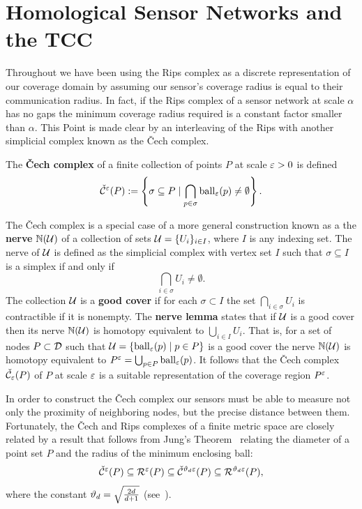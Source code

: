 \section{Homological Sensor Networks and the TCC} %
\label{sec:tcc}

Throughout we have been using the Rips complex as a discrete representation of our coverage domain by assuming our sensor's coverage radius is equal to their communication radius.
In fact, if the Rips complex of a sensor network at scale $\alpha$ has no gaps the minimum coverage radius required is a constant factor smaller than $\alpha$.
This Point is made clear by an interleaving of the Rips with another simplicial complex known as the \v Cech complex.

\begin{definition}
    The \textbf{\v Cech complex} of a finite collection of points $P$ at scale $\varepsilon > 0$ is defined
    \[ \check{\mathcal{C}}^\varepsilon(P) := \left\{\sigma \subseteq P\mid \bigcap_{p\in \sigma}\mathrm{ball}_\varepsilon(p)\neq \emptyset \right\}. \]
\end{definition}
The \v Cech complex is a special case of a more general construction known as a the \textbf{nerve} $\mathbb{N}({\mathcal{U}})$ of a collection of sets ${\mathcal{U}} = \{U_i\}_{i\in I}$, where $I$ is any indexing set.
The nerve of ${\mathcal{U}}$ is defined as the simplicial complex with vertex set $I$ such that $\sigma\subseteq I$ is a simplex if and only if \[\bigcap_{i\in \sigma} U_i\neq \emptyset.\]
The collection ${\mathcal{U}}$ is a \textbf{good cover} if for each $\sigma\subset I$ the set $\bigcap_{i\in\sigma} U_i$ is contractible if it is nonempty.
The \textbf{nerve lemma} states that if ${\mathcal{U}}$ is a good cover then its nerve $\mathbb{N}({\mathcal{U}})$ is homotopy equivalent to $\bigcup_{i\in I} U_i$.
That is, for a set of nodes $P\subset{\mathcal{D}}$ such that ${\mathcal{U}} = \{\mathrm{ball}_\varepsilon(p)\mid p\in P\}$ is a good cover the nerve $\mathbb{N}({\mathcal{U}})$ is homotopy equivalent to $P^\varepsilon = \bigcup_{p\in P} \mathrm{ball}_\varepsilon(p)$.
It follows that the \v Cech complex $\check{\mathcal{C}}_\varepsilon(P)$ of $P$ at scale $\varepsilon$ is a suitable representation of the coverage region $P^\varepsilon$.

In order to construct the \v Cech complex our sensors must be able to measure not only the proximity of neighboring nodes, but the precise distance between them.
Fortunately, the \v Cech and Rips complexes of a finite metric space are closely related by a result that follows from Jung's Theorem~\cite{jung01uber} relating the diameter of a point set $P$ and the radius of the minimum enclosing ball:
\begin{equation}\label{eq:jung_inclusion}
  \check{\mathcal{C}}^\varepsilon(P)\subseteq\mathcal{R}^\varepsilon(P)\subseteq\check{\mathcal{C}}^{\vartheta_d \varepsilon}(P)\subseteq\mathcal{R}^{\vartheta_d\varepsilon}(P),
\end{equation}
where the constant $\vartheta_d = \sqrt{\frac{2d}{d+1}}$ (see~\cite{buchet15efficient}).


